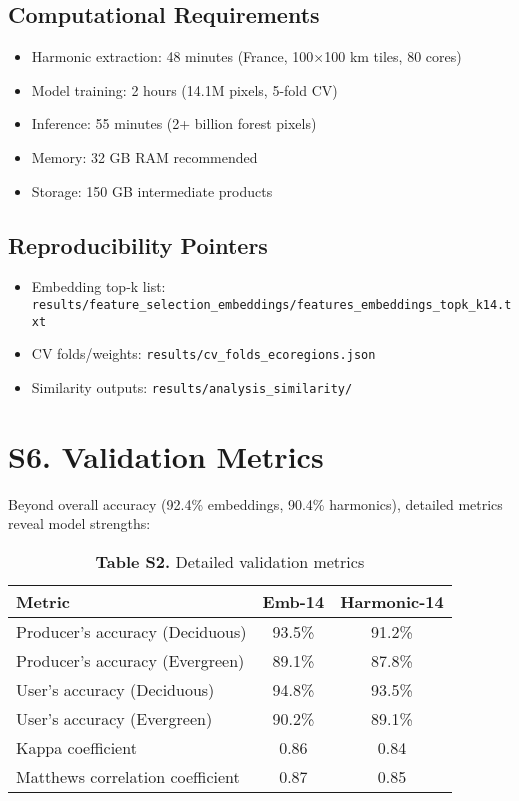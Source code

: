 \documentclass[utf8]{frontiers_suppmat}
\begin{document}
\subsection{Computational Requirements}
\begin{itemize}
    \item Harmonic extraction: 48 minutes (France, 100×100 km tiles, 80 cores)
    \item Model training: 2 hours (14.1M pixels, 5-fold CV)
    \item Inference: 55 minutes (2+ billion forest pixels)
    \item Memory: 32 GB RAM recommended
    \item Storage: 150 GB intermediate products
\end{itemize}

\subsection{Reproducibility Pointers}
\begin{itemize}
  \item Embedding top-k list: \texttt{results/feature\_selection\_embeddings/features\_embeddings\_topk\_k14.txt}
  \item CV folds/weights: \texttt{results/cv\_folds\_ecoregions.json}
  \item Similarity outputs: \texttt{results/analysis\_similarity/}
\end{itemize}

\section{S6. Validation Metrics}

Beyond overall accuracy (92.4\% embeddings, 90.4\% harmonics), detailed metrics reveal model strengths:

\begin{table}[H]
    \centering
    \caption{\textbf{Table S2.} Detailed validation metrics}
    \begin{tabular}{lcc}
        \hline
        \textbf{Metric} & \textbf{Emb-14} & \textbf{Harmonic-14} \\
        \hline
        Producer's accuracy (Deciduous) & 93.5\% & 91.2\% \\
        Producer's accuracy (Evergreen) & 89.1\% & 87.8\% \\
        User's accuracy (Deciduous) & 94.8\% & 93.5\% \\
        User's accuracy (Evergreen) & 90.2\% & 89.1\% \\
        Kappa coefficient & 0.86 & 0.84 \\
        Matthews correlation coefficient & 0.87 & 0.85 \\
        \hline
    \end{tabular}
    \label{tab:validation_metrics}
\end{table}
\end{document}
